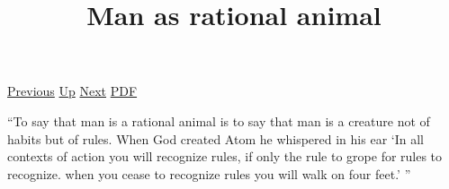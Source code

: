 \documentclass[12pt,a4paper]{report}
\begin{document}
 \href{doc/phil/People/Sellars/Quotes/LabelingvsDescribing.html}{Previous} 
 \href{doc/phil/People/Sellars/Quotes.html}{Up} 
 \href{doc/phil/People/Sellars/Quotes/Modalexpressionsasexplanations.html}{Next} 
 \href{doc/phil/People/Sellars/Quotes/Manasrationalanimal.pdf}{PDF} 
\title{Man as rational animal}
``To say that man is a rational animal is to say that man is a creature not of
habits but of rules. When God created Atom he whispered in his ear `In all
contexts of action you will recognize rules, if only the rule to grope for rules
to recognize. when you cease to recognize rules you will walk on four feet.' ''
\end{document}
